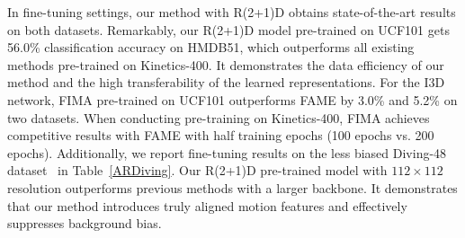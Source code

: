 \documentclass[sigconf,screen]{acmart}
\begin{document}
In fine-tuning settings, our method with R(2+1)D obtains state-of-the-art results on both datasets. Remarkably, our R(2+1)D model pre-trained on UCF101 gets 56.0\% classification accuracy on HMDB51, which outperforms all existing methods pre-trained on Kinetics-400. It demonstrates the data efficiency of our method and the high transferability of the learned representations. For the I3D network, FIMA pre-trained on UCF101 outperforms FAME by 3.0\% and 5.2\% on two datasets. When conducting pre-training on Kinetics-400, FIMA achieves competitive results with FAME with half training epochs (100 epochs vs. 200 epochs). 
Additionally, we report fine-tuning results on the less biased Diving-48 dataset~\cite{Diving48} in Table~\ref{ARDiving}. Our R(2+1)D pre-trained model with $112 \times 112$ resolution outperforms previous methods with a larger backbone. It demonstrates that our method introduces truly aligned motion features and effectively suppresses background bias.
\end{document}
